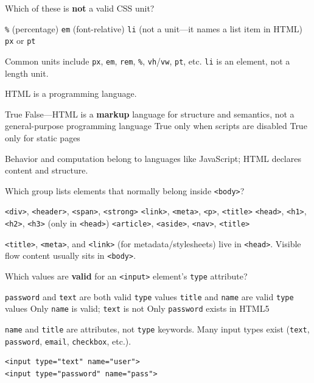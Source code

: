 \question[4]
Which of these is \textbf{not} a valid CSS unit?
\begin{choices}
  \choice \texttt{\%} (percentage)
  \choice \texttt{em} (font-relative)
  \CorrectChoice \texttt{li} (not a unit---it names a list item in HTML)
  \choice \texttt{px} or \texttt{pt}
\end{choices}
\begin{solution}
  Common units include \texttt{px}, \texttt{em}, \texttt{rem}, \texttt{\%}, \texttt{vh}/\texttt{vw}, \texttt{pt}, etc. \texttt{li} is an element, not a length unit.
\end{solution}

\question[4]
HTML is a programming language.
\begin{choices}
  \choice True
  \CorrectChoice False---HTML is a \textbf{markup} language for structure and semantics, not a general-purpose programming language
  \choice True only when scripts are disabled
  \choice True only for static pages
\end{choices}
\begin{solution}
  Behavior and computation belong to languages like JavaScript; HTML declares content and structure.
\end{solution}

\question[4]
Which group lists elements that normally belong inside \texttt{<body>}?
\begin{choices}
  \CorrectChoice \texttt{<div>}, \texttt{<header>}, \texttt{<span>}, \texttt{<strong>}
  \choice \texttt{<link>}, \texttt{<meta>}, \texttt{<p>}, \texttt{<title>}
  \choice \texttt{<head>}, \texttt{<h1>}, \texttt{<h2>}, \texttt{<h3>} (only in \texttt{<head>})
  \choice \texttt{<article>}, \texttt{<aside>}, \texttt{<nav>}, \texttt{<title>}
\end{choices}
\begin{solution}
  \texttt{<title>}, \texttt{<meta>}, and \texttt{<link>} (for metadata/stylesheets) live in \texttt{<head>}. Visible flow content usually sits in \texttt{<body>}.
\end{solution}

\question[4]
Which values are \textbf{valid} for an \texttt{<input>} element's \texttt{type} attribute?
\begin{choices}
  \CorrectChoice \texttt{password} and \texttt{text} are both valid \texttt{type} values
  \choice \texttt{title} and \texttt{name} are valid \texttt{type} values
  \choice Only \texttt{name} is valid; \texttt{text} is not
  \choice Only \texttt{password} exists in HTML5
\end{choices}
\begin{solution}
  \texttt{name} and \texttt{title} are attributes, not \texttt{type} keywords. Many input types exist (\texttt{text}, \texttt{password}, \texttt{email}, \texttt{checkbox}, etc.).
\begin{lstlisting}[style=htmlinline]
<input type="text" name="user">
<input type="password" name="pass">
\end{lstlisting}
\end{solution}


